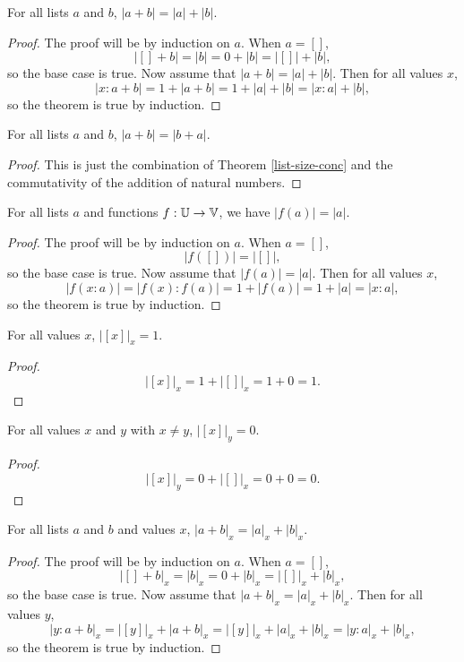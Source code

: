 \documentclass[../math.tex]{subfiles}
\begin{document}
\begin{theorem} \label{list-size-conc}
    For all lists $a$ and $b$, $|a + b| = |a| + |b|$.
\end{theorem}
\begin{proof}
    The proof will be by induction on $a$.  When $a = []$,
    \[
        |[] + b| = |b| = 0 + |b| = |[]| + |b|,
    \]
    so the base case is true.  Now assume that $|a + b| = |a| + |b|$.  Then for
    all values $x$,
    \[
        |x : a + b| = 1 + |a + b| = 1 + |a| + |b| = |x : a| + |b|,
    \]
    so the theorem is true by induction.
\end{proof}

\begin{theorem} \label{list-size-comm}
    For all lists $a$ and $b$, $|a + b| = |b + a|$.
\end{theorem}
\begin{proof}
    This is just the combination of Theorem \ref{list-size-conc} and the
    commutativity of the addition of natural numbers.
\end{proof}

\begin{theorem} \label{list-image-size}
    For all lists $a$ and functions $f : \mathbb{U} \to \mathbb{V}$, we have $|f(a)| = |a|$.
\end{theorem}
\begin{proof}
    The proof will be by induction on $a$.  When $a = []$,
    \[
        |f([])| = |[]|,
    \]
    so the base case is true.  Now assume that $|f(a)| = |a|$.  Then for all
    values $x$,
    \[
        |f(x : a)| = |f(x) : f(a)| = 1 + |f(a)| = 1 + |a| = |x : a|,
    \]
    so the theorem is true by induction.
\end{proof}

\begin{theorem}
    For all values $x$, $|[x]|_x = 1$.
\end{theorem}
\begin{proof}
    \[
        |[x]|_x = 1 + |[]|_x = 1 + 0 = 1.
    \]
\end{proof}

\begin{theorem}
    For all values $x$ and $y$ with $x \neq y$, $|[x]|_y = 0$.
\end{theorem}
\begin{proof}
    \[
        |[x]|_y = 0 + |[]|_x = 0 + 0 = 0.
    \]
\end{proof}

\begin{theorem} \label{list-count-conc}
    For all lists $a$ and $b$ and values $x$, $|a + b|_x = |a|_x + |b|_x$.
\end{theorem}
\begin{proof}
    The proof will be by induction on $a$.  When $a = []$,
    \[
        |[] + b|_x = |b|_x = 0 + |b|_x = |[]|_x + |b|_x,
    \]
    so the base case is true.  Now assume that $|a + b|_x = |a|_x + |b|_x$.
    Then for all values $y$,
    \[
        |y : a + b|_x = |[y]|_x + |a + b|_x = |[y]|_x + |a|_x + |b|_x
        = |y : a|_x + |b|_x,
    \]
    so the theorem is true by induction.
\end{proof}
\end{document}
